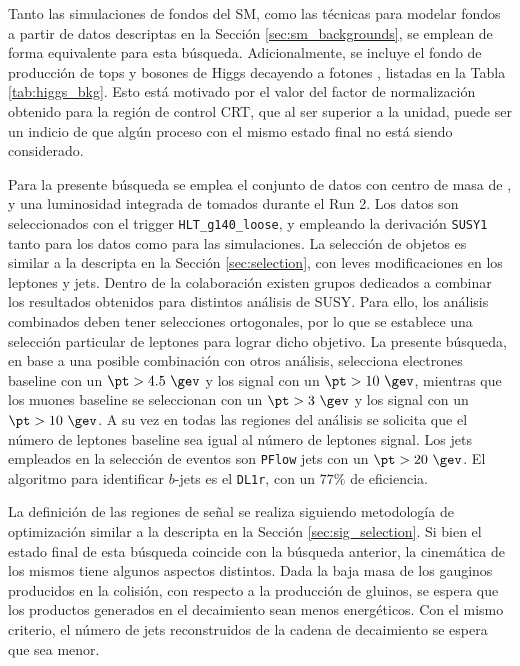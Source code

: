 Tanto las simulaciones de fondos del SM, como las técnicas para modelar fondos a partir de datos descriptas en la Sección \ref{sec:sm_backgrounds}, se emplean de forma equivalente para esta búsqueda. Adicionalmente, se incluye el fondo de producción de tops y bosones de Higgs decayendo a fotones \cite{tesis_jose}, listadas en la Tabla \ref{tab:higgs_bkg}. Esto está motivado por el valor del factor de normalización obtenido para la región de control CRT, que al ser superior a la unidad, puede ser un indicio de que algún proceso con el mismo estado final no está siendo considerado.



Para la presente búsqueda se emplea el conjunto de datos con centro de masa de , y una luminosidad integrada de  tomados durante el Run 2. Los datos son seleccionados con el trigger \texttt{HLT\_g140\_loose}, y empleando la derivación \texttt{SUSY1} tanto para los datos como para las simulaciones. La selección de objetos es similar a la descripta en la Sección \ref{sec:selection}, con leves modificaciones en los leptones y jets. Dentro de la colaboración existen grupos dedicados a combinar los resultados obtenidos para distintos análisis de SUSY. Para ello, los análisis combinados deben tener selecciones ortogonales, por lo que se establece una selección particular de leptones para lograr dicho objetivo. La presente búsqueda, en base a una posible combinación con otros análisis, selecciona electrones baseline con un $\pt>4.5\ \gev$ y los signal con un $\pt>10 \ \gev$, mientras que los muones baseline se seleccionan con un $\pt>3\ \gev$ y los signal con un $\pt>10\ \gev$. A su vez en todas las regiones del análisis se solicita que el número de leptones baseline sea igual al número de leptones signal. Los jets empleados en la selección de eventos son \texttt{PFlow} jets con un $\pt>20\ \gev$. El algoritmo para identificar $b$-jets es el \texttt{DL1r}, con un $77\%$ de eficiencia.




La definición de las regiones de señal se realiza siguiendo metodología de optimización similar a la descripta en la Sección \ref{sec:sig_selection}.
Si bien el estado final de esta búsqueda coincide con la búsqueda anterior, la cinemática de los mismos tiene algunos aspectos distintos. Dada la baja masa de los gauginos producidos en la colisión, con respecto a la producción de gluinos, se espera que los productos generados en el decaimiento sean menos energéticos. Con el mismo criterio, el número de jets reconstruidos de la cadena de decaimiento se espera que sea menor.

